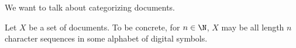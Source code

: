 

We want to talk about categorizing documents.


Let $X$ be a set of documents.
To be concrete, for $n \in \N$, $X$ may be all length $n$ character sequences in some alphabet of digital symbols.

\blankpage

